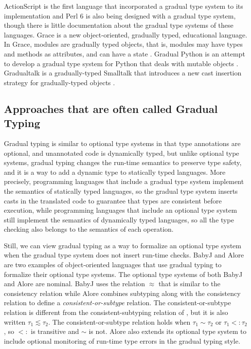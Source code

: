 \documentclass[preprint]{sig-alternate}
\begin{document}
ActionScript \citep{moock2007as3} is the first language that
incorporated a gradual type system to its implementation and
Perl 6 \citep{tang2007pri} is also being designed with a
gradual type system, though there is little documentation about
the gradual type systems of these languages.
Grace \citep{black2012grace,black2013sg} is a new object-oriented,
gradually typed, educational language.
In Grace, modules are gradually typed objects, that is, modules
may have types and methods as attributes, and can have a state
\citep{homer2013modules}.
Gradual Python \citep{reticulated} is an attempt to develop a
gradual type system for Python that deals with mutable objects
\citep{siek2013mutable}.
Gradualtalk \citep{allende2013gts} is a gradually-typed Smalltalk
that introduces a new cast insertion strategy for gradually-typed
objects \citep{allende2013cis}.

\subsection{Approaches that are often called Gradual Typing}

Gradual typing is similar to optional type systems in that type
annotations are optional, and unannotated code is dynamically
typed, but unlike optional type systems, gradual typing changes 
the run-time semantics to preserve type safety, and it is a way to
add a dynamic type to statically typed languages. 
More precisely, programming languages that include a gradual type
system implement the semantics of statically typed languages, so
the gradual type system inserts casts in the translated code to
guarantee that types are consistent before execution, while
programming languages that include an optional type system still
implement the semantics of dynamically typed languages, so all
the type checking also belongs to the semantics of each operation.

Still, we can view gradual typing as a way to formalize an optional
type system when the gradual type system does not insert run-time
checks.
BabyJ \citep{anderson2002babyj} and Alore \citep{lehtosalo2011alore}
are two examples of object-oriented languages that use gradual
typing to formalize their optional type systems.
The optional type systems of both BabyJ and Alore are nominal.
BabyJ uses the relation $\approx$ that is similar to the consistency
relation while Alore combines  subtyping along with the consistency
relation to define a \textit{consistent-or-subtype} relation.
The consistent-or-subtype relation is different from the
consistent-subtyping relation of \citet{siek2007objects}, but it is
also written $\tau_{1} \lesssim \tau_{2}$.
The consistent-or-subtype relation holds when $\tau_{1} \sim \tau_{2}$
or $\tau_{1} <: \tau_{2}$, so $<:$ is transitive and $\sim$ is not.
Alore also extends its optional type system to include optional
monitoring of run-time type errors in the gradual typing style.
\end{document}
